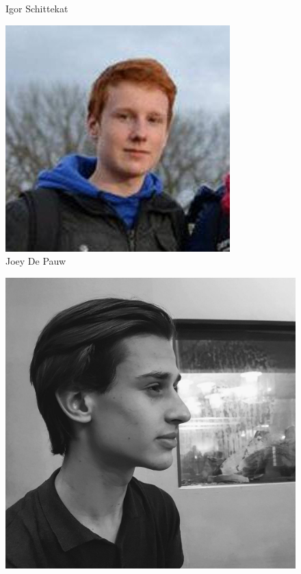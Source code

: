 \begin{frame}
\begin{figure}
\begin{minipage}{0.3\linewidth}
           	\footnotesize Igor Schittekat 
       	\end{minipage}
        \begin{minipage}{0.3\linewidth}
           	\centering
			\includegraphics[width=\linewidth]{res/joey} \\
           	\footnotesize Joey De Pauw
       	\end{minipage}
        \begin{minipage}{0.3\linewidth}
           	\centering
			\includegraphics[width=\linewidth]{res/senne} \\

\end{minipage}
\end{figure}
\end{frame}
